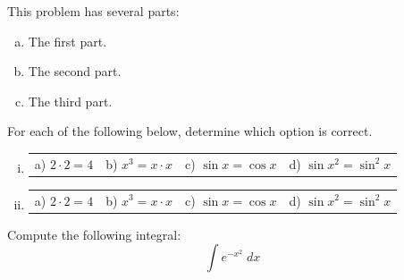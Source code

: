 \documentclass[11pt,letterpaper]{article}
\begin{document}


\begin{exercise}
This problem has several parts:
	\begin{enumerate}[(a)]
	\item The first part.
	\item The second part. 
	\item The third part. 
	\end{enumerate}
\end{exercise}



\begin{exercise}
For each of the following below, determine which option is correct.
\begin{enumerate}[(i)]
\item 
        \begin{tabular}{p{3cm}p{3cm}p{3cm}p{3cm}}
        a) $2 \cdot 2= 4$ & b) $x^3= x \cdot x$ & c) $\sin x = \cos x$ & d) $\sin x^2= \sin^2 x$
        \end{tabular} 
        \item
        \begin{tabular}{p{3cm}p{3cm}p{3cm}p{3cm}}
        a) $2 \cdot 2= 4$ & b) $x^3= x \cdot x$ & c) $\sin x = \cos x$ & d) $\sin x^2= \sin^2 x$
        \end{tabular} 
\end{enumerate}
\end{exercise}



\begin{exercise}
Compute the following integral:
	\[
	\int e^{-x^2} \;dx
	\] \vspace{6cm}
\end{exercise}
\end{document}
